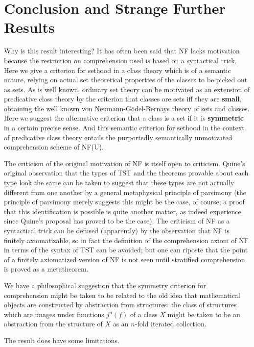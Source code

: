 \documentclass[12pt]{article}
\begin{document}
\newpage

\section{Conclusion and Strange Further Results}

Why is this result interesting?  It has often been said that NF lacks motivation because the restriction on comprehension used is based on a syntactical trick.    Here we give a criterion for sethood in a class theory which is of a semantic nature, relying on actual set theoretical properties of the classes to be picked out as sets.  As is well known, ordinary set theory can be motivated
as an extension of predicative class theory by the criterion that classes are sets iff they are {\bf small}, obtaining the well known von Neumann-G\"odel-Bernays theory of sets and classes.  Here we suggest the alternative criterion that a class is a set if it is {\bf symmetric} in a certain precise sense.  And this semantic criterion for sethood in the context of predicative class theory entails the purportedly semantically unmotivated comprehension scheme of NF(U).

The criticism of the original motivation of NF is itself open to criticism.  Quine's original observation that the types of TST and the theorems provable about each type look the same can be taken to suggest that these types are not actually different from one another by a general metaphysical principle of parsimony (the principle of parsimony merely suggests this might be the case, of course; a proof that this identification is possible is quite another matter, as indeed experience since Quine's proposal has proved to be the case).  The criticism of NF as a syntactical trick can be defused (apparently) by the observation that NF is finitely axiomatizable, so in fact the definition of the comprehension axiom of NF in terms of the syntax of TST can be avoided;  but one can riposte that the point of a finitely axiomatized version of NF is not seen until stratified comprehension is proved as a metatheorem. 

We have a philosophical suggestion that the symmetry criterion for comprehension might be taken to be related to the old idea that mathematical objects are constructed by abstraction from structures:  the class of structures which are images under functions $j^n(f)$ of a class $X$ might be taken to be an abstraction from the structure of $X$ as an $n$-fold iterated collection.

The result does have some limitations.
\end{document}
